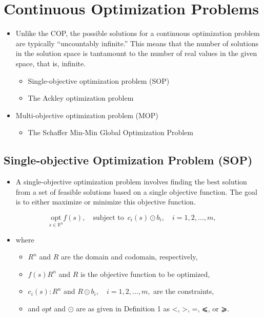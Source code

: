 \documentclass[
  letterpaper,
  DIV=11,
  numbers=noendperiod]{scrreprt}
\providecommand{\tightlist}{%
  \setlength{\itemsep}{0pt}\setlength{\parskip}{0pt}}\usepackage{longtable,booktabs,array}
\begin{document}

\chapter{Continuous Optimization
Problems}\label{continuous-optimization-problems}

\begin{itemize}
\tightlist
\item
  Unlike the COP, the possible solutions for a continuous optimization
  problem are typically ``uncountably infinite.'' This means that the
  number of solutions in the solution space is tantamount to the number
  of real values in the given space, that is, infinite.

  \begin{itemize}
  \tightlist
  \item
    Single-objective optimization problem (SOP)
  \item
    The Ackley optimization problem
  \end{itemize}
\item
  Multi-objective optimization problem (MOP)

  \begin{itemize}
  \tightlist
  \item
    The Schaffer Min-Min Global Optimization Problem
  \end{itemize}
\end{itemize}

\section{Single-objective Optimization Problem
(SOP)}\label{single-objective-optimization-problem-sop}

\begin{itemize}
\tightlist
\item
  A single-objective optimization problem involves finding the best
  solution from a set of feasible solutions based on a single objective
  function. The goal is to either maximize or minimize this objective
  function.
\end{itemize}

\[\underset{s \in \mathbb{R}^n}{\text{opt}} f(s), \quad \text{subject to } \, c_i(s) \odot b_i, \quad i = 1, 2, \ldots, m,\]

\begin{itemize}
\tightlist
\item
  where

  \begin{itemize}
  \tightlist
  \item
    \({R}^n\) and \({R}\) are the domain and codomain, respectively,
  \item
    \(f(s) {R}^n\) and \({R}\) is the objective function to be
    optimized,
  \item
    \(c_i(s): {R}^n\) and \({R}\odot b_i, \quad i = 1, 2, \ldots, m,\)
    are the constraints,
  \item
    and \(opt\) and \(\odot\) are as given in Definition 1 as \textless,
    \textgreater, =, ⩽, or ⩾.
  \end{itemize}
\end{itemize}
\end{document}
